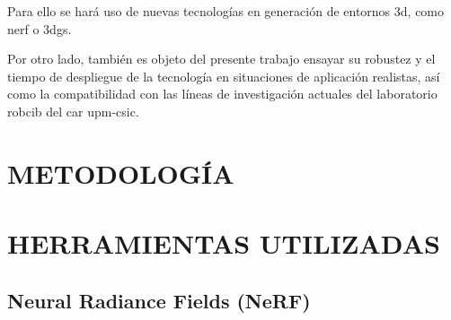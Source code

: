 \documentclass[a4paper, 12pt, spanish, twoside]{article}
\begin{document}
Para ello se hará uso de nuevas tecnologías en generación de entornos \acrshort{3d}, como \acrfull{nerf} o \acrfull{3dgs}.

Por otro lado, también es objeto del presente trabajo ensayar su robustez y el tiempo de despliegue de la tecnología en situaciones de aplicación realistas, así como la compatibilidad con las líneas de investigación actuales del laboratorio \acrshort{robcib} del \acrshort{car} \acrshort{upm}-\acrshort{csic}.

\clearpage





\newpage
\section{METODOLOGÍA} \label{sec:metodologia}



\clearpage





\newpage
\section{HERRAMIENTAS UTILIZADAS} \label{sec:herramientas}


\subsection{Neural Radiance Fields (NeRF)} \label{sec:herramientas:nerf}
\end{document}
